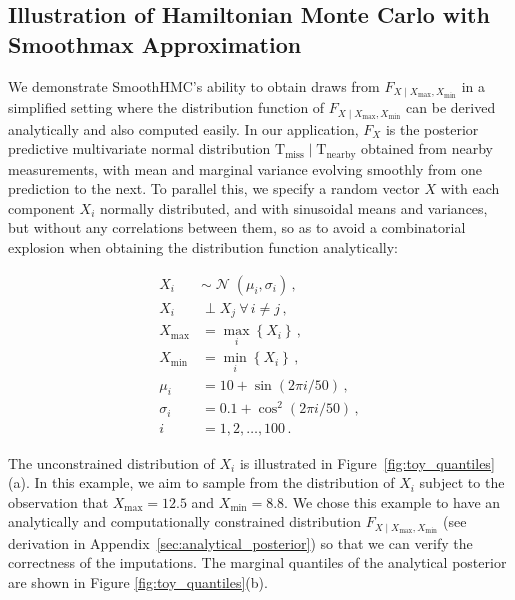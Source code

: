 \documentclass[letter]{article}
\newcommand{\genericdel}[3]{%
      \left#1#3\right#2
    }
\newcommand{\del}[1]{\genericdel(){#1}}
\newcommand{\cbr}[1]{\genericdel\{\}{#1}}
\DeclareMathOperator{\normal}{\mathcal{N}}
\newcommand{\T}{\mathrm{T}}
\newcommand{\indep}{\perp}
\newcommand{\miss}{\mathrm{miss}}
\newcommand{\obs}{\mathrm{nearby}}
\newcommand{\Xmax}{X_{\max}}
\newcommand{\Xmin}{X_{\min}}
\newcommand{\Fcond}{F_{X \mid \Xmax,\Xmin}}
\newcommand{\eqlabel}[1]{\label{#1}}
\begin{document}
        \subsection{Illustration of Hamiltonian Monte Carlo with Smoothmax Approximation}\label{illustration-of-hamiltonian-monte-carlo-with-smoothmax-approximation}
    

\label{sec:toy_example}
        We demonstrate SmoothHMC's ability to obtain draws from \(\Fcond\) in a simplified setting where the distribution function of \(\Fcond\) can be derived analytically and also computed easily.
In our application, \(F_X\) is the posterior predictive multivariate normal distribution \(\T_\miss \mid \T_\obs\) obtained from nearby measurements, with mean and marginal variance evolving smoothly from one prediction to the next.
To parallel this, we specify a random vector \(X\) with each component \(X_i\) normally distributed, and with sinusoidal means and variances, but without any correlations between them,
so as to avoid a combinatorial explosion when obtaining the distribution function analytically:

\begin{equation}
\begin{split}
X_i &\sim \normal \del{\mu_i, \sigma_i} \,, \\
X_i & \indep X_j ~\forall\, i \neq j \,, \\
\Xmax &= \max_i\cbr{X_i} \,, \\
\Xmin &= \min_i\cbr{X_i} \,,\\
\mu_i &= 10 + \sin\del{2\pi i / 50} \,, \\
\sigma_i &= 0.1+\cos^2\del{2\pi i / 50} \,, \\
i &= 1, 2, \ldots, 100 \,.
\end{split}
\eqlabel{eq:toyspec}
\end{equation}

The unconstrained distribution of \(X_i\) is illustrated in Figure~\ref{fig:toy_quantiles}(a).
In this example, we aim to sample from the distribution of \(X_i\) subject to the observation that \(\Xmax=12.5\) and \(\Xmin=8.8\).
We chose this example to have an analytically and computationally constrained distribution \(\Fcond\) (see derivation in Appendix~\ref{sec:analytical_posterior}) so that we can verify the correctness of the imputations.
The marginal quantiles of the analytical posterior are shown in Figure \ref{fig:toy_quantiles}(b).
    
\end{document}
